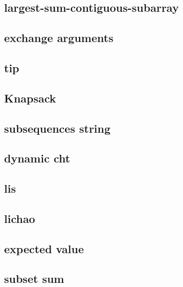 \subsection{largest-sum-contiguous-subarray}
\raggedbottom
\hrulefill
\subsection{exchange arguments}
\raggedbottom
\hrulefill
\subsection{tip}
\raggedbottom
\hrulefill
\subsection{Knapsack}
\raggedbottom
\hrulefill
\subsection{subsequences string}
\raggedbottom
\hrulefill
\subsection{dynamic cht}
\raggedbottom
\hrulefill
\subsection{lis}
\raggedbottom
\hrulefill
\subsection{lichao}
\raggedbottom
\hrulefill
\subsection{expected value}
\raggedbottom
\hrulefill
\subsection{subset sum}
\raggedbottom
\hrulefill
